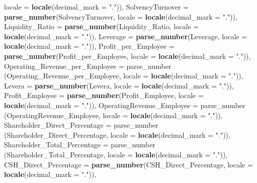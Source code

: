 \documentclass[
]{article}
\newenvironment{Shaded}{\begin{snugshade}}{\end{snugshade}}
\newcommand{\AttributeTok}[1]{\textcolor[rgb]{0.13,0.29,0.53}{#1}}
\newcommand{\FunctionTok}[1]{\textcolor[rgb]{0.13,0.29,0.53}{\textbf{#1}}}
\newcommand{\NormalTok}[1]{#1}
\newcommand{\StringTok}[1]{\textcolor[rgb]{0.31,0.60,0.02}{#1}}
\begin{document}
\begin{Shaded}
\begin{Highlighting}[]
                                     \AttributeTok{locale =} \FunctionTok{locale}\NormalTok{(}\AttributeTok{decimal\_mark =} \StringTok{"."}\NormalTok{)),}
    \AttributeTok{SolvencyTurnover =} \FunctionTok{parse\_number}\NormalTok{(SolvencyTurnover, }
                                    \AttributeTok{locale =} \FunctionTok{locale}\NormalTok{(}\AttributeTok{decimal\_mark =} \StringTok{"."}\NormalTok{)),}
    \AttributeTok{Liquidity\_Ratio =} \FunctionTok{parse\_number}\NormalTok{(Liquidity\_Ratio, }
                                   \AttributeTok{locale =} \FunctionTok{locale}\NormalTok{(}\AttributeTok{decimal\_mark =} \StringTok{"."}\NormalTok{)),}
    \AttributeTok{Leverage =} \FunctionTok{parse\_number}\NormalTok{(Leverage, }\AttributeTok{locale =} 
                              \FunctionTok{locale}\NormalTok{(}\AttributeTok{decimal\_mark =} \StringTok{"."}\NormalTok{)),}
    \AttributeTok{Profit\_per\_Employee =} \FunctionTok{parse\_number}\NormalTok{(Profit\_per\_Employee, }
                                       \AttributeTok{locale =} \FunctionTok{locale}\NormalTok{(}\AttributeTok{decimal\_mark =} \StringTok{"."}\NormalTok{)),}
    \AttributeTok{Operating\_Revenue\_per\_Employee =}\NormalTok{ parse\_number}
\NormalTok{    (Operating\_Revenue\_per\_Employee, }\AttributeTok{locale =} \FunctionTok{locale}\NormalTok{(}\AttributeTok{decimal\_mark =} \StringTok{"."}\NormalTok{)),}
    \AttributeTok{Levera =} \FunctionTok{parse\_number}\NormalTok{(Levera, }
                          \AttributeTok{locale =} \FunctionTok{locale}\NormalTok{(}\AttributeTok{decimal\_mark =} \StringTok{"."}\NormalTok{)),}
    \AttributeTok{Profit\_Employee =} \FunctionTok{parse\_number}\NormalTok{(Profit\_Employee, }
                                   \AttributeTok{locale =} \FunctionTok{locale}\NormalTok{(}\AttributeTok{decimal\_mark =} \StringTok{"."}\NormalTok{)),}
    \AttributeTok{OperatingRevenue\_Employee =}\NormalTok{ parse\_number}
\NormalTok{    (OperatingRevenue\_Employee, }\AttributeTok{locale =} \FunctionTok{locale}\NormalTok{(}\AttributeTok{decimal\_mark =} \StringTok{"."}\NormalTok{)),}
    \AttributeTok{Shareholder\_Direct\_Percentage =}\NormalTok{ parse\_number}
\NormalTok{    (Shareholder\_Direct\_Percentage, }\AttributeTok{locale =} \FunctionTok{locale}\NormalTok{(}\AttributeTok{decimal\_mark =} \StringTok{"."}\NormalTok{)),}
    \AttributeTok{Shareholder\_Total\_Percentage =}\NormalTok{ parse\_number}
\NormalTok{    (Shareholder\_Total\_Percentage, }\AttributeTok{locale =} \FunctionTok{locale}\NormalTok{(}\AttributeTok{decimal\_mark =} \StringTok{"."}\NormalTok{)),}
    \AttributeTok{CSH\_Direct\_Percentage =} \FunctionTok{parse\_number}\NormalTok{(CSH\_Direct\_Percentage, }
                                         \AttributeTok{locale =} \FunctionTok{locale}\NormalTok{(}\AttributeTok{decimal\_mark =} \StringTok{"."}\NormalTok{)),}
 

\end{Highlighting}
\end{Shaded}
\end{document}
